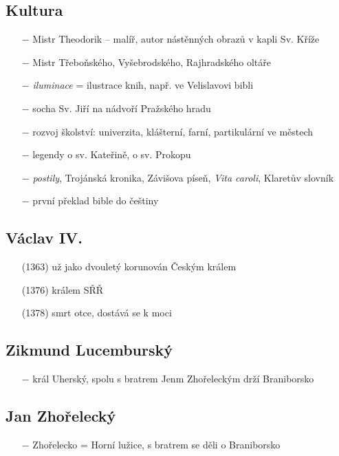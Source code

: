 \documentclass{article}
\begin{document}
\subsection*{Kultura}
\begin{itemize}
    \vspace{-0.5em}
    \setlength\itemsep{0.15em}
    \item[$-$] Mistr Theodorik -- malíř, autor nástěnných obrazů v kapli Sv. Kříže
    \item[$-$] Mistr Třeboňského, Vyšebrodského, Rajhradského oltáře
    \item[$-$] \textit{iluminace} = ilustrace knih, např. ve Velislavovi bibli
    \item[$-$] socha Sv. Jiří na nádvoří Pražského hradu
    \item[$-$] rozvoj školství: univerzita, klášterní, farní, partikulární ve městech
    \item[$-$] legendy o sv. Kateřině, o sv. Prokopu
    \item[$-$] \textit{postily}, Trojánská kronika, Závišova píseň, \textit{Vita caroli}, Klaretův slovník
    \item[$-$] první překlad bible do češtiny
\end{itemize}

\subsection*{Václav IV.}
\begin{itemize}
    \vspace{-0.5em}
    \setlength\itemsep{0.15em}
    \item[(1363)] už jako dvouletý korunován Českým králem
    \item[(1376)] králem SŘŘ
    \item[(1378)] smrt otce, dostává se k moci
\end{itemize}


\subsection*{Zikmund Lucemburský}
\begin{itemize}
    \vspace{-0.5em}
    \setlength\itemsep{0.15em}
    \item[$-$] král Uherský, spolu s bratrem Jenm Zhořeleckým drží Braniborsko
\end{itemize}

\subsection*{Jan Zhořelecký}
\begin{itemize}
    \vspace{-0.5em}
    \setlength\itemsep{0.15em}
    \item[$-$] Zhořelecko = Horní lužice, s bratrem se děli o Braniborsko
\end{itemize}
\end{document}
